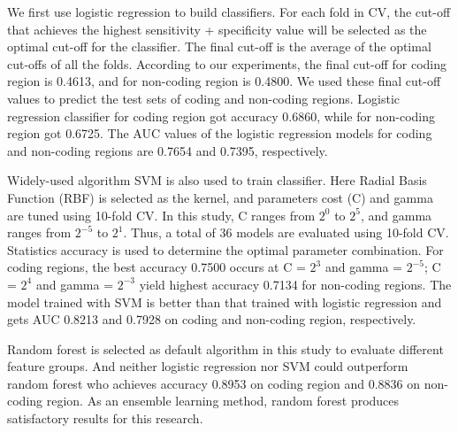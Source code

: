 \documentclass[a4paper,nohyper,nobib,openany,justified]{tufte-book}
\begin{document}
\begin{fullwidth}
We first use logistic regression to build classifiers. For each fold in CV, the cut-off that achieves the highest sensitivity + specificity value will be selected as the optimal cut-off for the classifier. The final cut-off is the average of the optimal cut-offs of all the folds. According to our experiments, the final cut-off for coding region is 0.4613, and for non-coding region is 0.4800. We used these final cut-off values to predict the test sets of coding and non-coding regions. Logistic regression classifier for coding region got accuracy 0.6860, while for non-coding region got 0.6725. The AUC values of the logistic regression models for coding and non-coding regions are 0.7654 and 0.7395, respectively.

Widely-used algorithm SVM is also used to train classifier. Here Radial Basis Function (RBF) is selected as the kernel, and parameters cost (C) and gamma are tuned using 10-fold CV. In this study, C ranges from $2^0$ to $2^5$, and gamma ranges from $2^{-5}$ to $2^1$. Thus, a total of 36 models are evaluated using 10-fold CV. Statistics accuracy is used to determine the optimal parameter combination. For coding regions, the best accuracy 0.7500 occurs at C = $2^3$ and gamma = $2^{-5}$; C = $2^4$ and gamma = $2^{-3}$ yield highest accuracy 0.7134 for non-coding regions. The model trained with SVM is better than that trained with logistic regression and gets AUC 0.8213 and 0.7928 on coding and non-coding region, respectively.

Random forest is selected as default algorithm in this study to evaluate different feature groups. And neither logistic regression nor SVM could outperform random forest who achieves accuracy 0.8953 on coding region and 0.8836 on non-coding region. As an ensemble learning method, random forest produces satisfactory results for this research.


\end{fullwidth}
\end{document}
